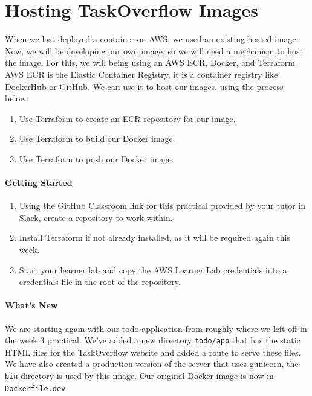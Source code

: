 \documentclass{csse4400}
\begin{document}
\section{Hosting TaskOverflow Images}

When we last deployed a container on AWS,
we used an existing hosted image.
Now, we will be developing our own image,
so we will need a mechanism to host the image.
For this, we will being using an AWS ECR, Docker, and Terraform.
AWS ECR is the Elastic Container Registry,
it is a container registry like DockerHub or GitHub.
We can use it to host our images,
using the process below:

\begin{enumerate}
    \item Use Terraform to create an ECR repository for our image.
    \item Use Terraform to build our Docker image.
    \item Use Terraform to push our Docker image.
\end{enumerate}


\paragraph{Getting Started}

\begin{enumerate}
    \item Using the GitHub Classroom link for this practical provided by your tutor in Slack, create a repository to work within.
    \item Install Terraform if not already installed, as it will be required again this week.
    \item Start your learner lab and copy the AWS Learner Lab credentials into a credentials file in the root of the repository.
\end{enumerate}

\paragraph{What's New}
We are starting again with our todo application from roughly where we left off in the week 3 practical.
We've added a new directory \texttt{todo/app} that has the static HTML files for the TaskOverflow website and added a route to serve these files.
We have also created a production version of the server that uses gunicorn,
the \texttt{bin} directory is used by this image.
Our original Docker image is now in \texttt{Dockerfile.dev}.\\
\end{document}
